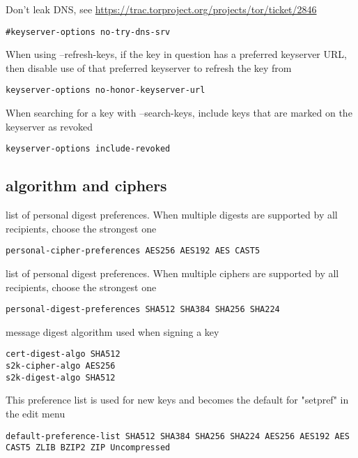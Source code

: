 \documentclass[11pt]{article}
\begin{document}
Don't leak DNS, see \url{https://trac.torproject.org/projects/tor/ticket/2846}
\begin{verbatim}
#keyserver-options no-try-dns-srv
\end{verbatim}


When using --refresh-keys, if the key in question has a preferred keyserver URL, then disable use of that preferred keyserver to refresh the key from
\begin{verbatim}
keyserver-options no-honor-keyserver-url
\end{verbatim}

When searching for a key with --search-keys, include keys that are marked on the keyserver as revoked
\begin{verbatim}
keyserver-options include-revoked
\end{verbatim}

\subsection{algorithm and ciphers}
\label{sec:orgb4145e5}
list of personal digest preferences. When multiple digests are supported by all recipients, choose the strongest one
\begin{verbatim}
personal-cipher-preferences AES256 AES192 AES CAST5
\end{verbatim}

list of personal digest preferences. When multiple ciphers are supported by all recipients, choose the strongest one
\begin{verbatim}
personal-digest-preferences SHA512 SHA384 SHA256 SHA224
\end{verbatim}

message digest algorithm used when signing a key
\begin{verbatim}
cert-digest-algo SHA512
s2k-cipher-algo AES256
s2k-digest-algo SHA512
\end{verbatim}

This preference list is used for new keys and becomes the default for "setpref" in the edit menu
\begin{verbatim}
default-preference-list SHA512 SHA384 SHA256 SHA224 AES256 AES192 AES CAST5 ZLIB BZIP2 ZIP Uncompressed
\end{verbatim}
\end{document}
